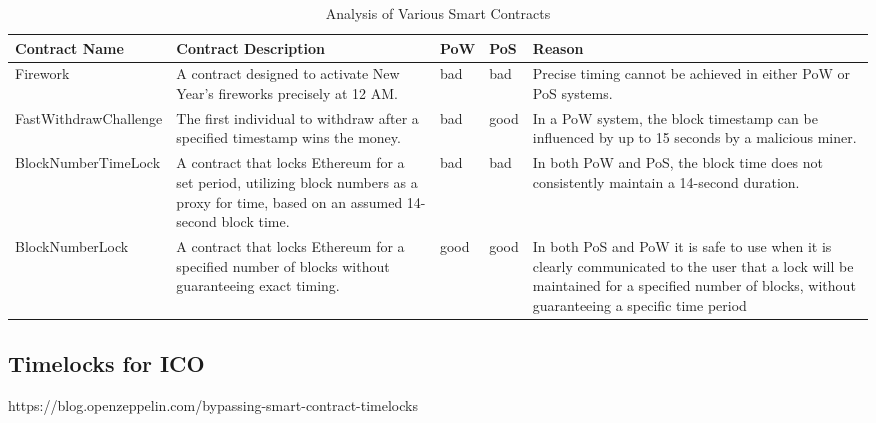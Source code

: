 \begin{table}[h]
\centering
\small %
\begin{tabularx}{\textwidth}{L{3.5cm}L{3.5cm}C{0.5cm}C{0.5cm}X} %
\hline
\textbf{Contract Name}& \textbf{Contract Description}                                                                                                                           & \textbf{PoW} & \textbf{PoS} & \textbf{Reason}                                                                                                                                                                                \\ \hline
Firework              & A contract designed to activate New Year's fireworks precisely at 12 AM.                                                                & bad          & bad          & Precise timing cannot be achieved in either PoW or PoS systems.                                                                                                                                \\ \hline
FastWithdrawChallenge & The first individual to withdraw after a specified timestamp wins the money.                                                            & bad          & good         & In a PoW system, the block timestamp can be influenced by up to 15 seconds by a malicious miner.                                                                                               \\ \hline
BlockNumberTimeLock   & A contract that locks Ethereum for a set period, utilizing block numbers as a proxy for time, based on an assumed 14-second block time. & bad          & bad          & In both PoW and PoS, the block time does not consistently maintain a 14-second duration.                                                                                                       \\ \hline
BlockNumberLock       & A contract that locks Ethereum for a specified number of blocks without guaranteeing exact timing.                                      & good         & good         & In both PoS and PoW it is safe to use when it is clearly communicated to the user that a lock will be maintained for a specified number of blocks, without guaranteeing a specific time period


\end{tabularx}
\caption{Analysis of Various Smart Contracts}
\label{tab:smart_contracts}
\end{table}
\subsection{Timelocks for ICO}
https://blog.openzeppelin.com/bypassing-smart-contract-timelocks

